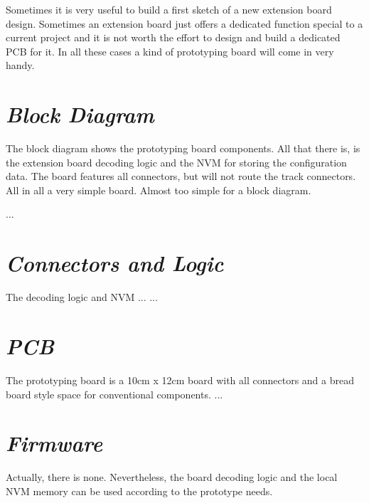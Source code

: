 
Sometimes it is very useful to build a first sketch of a new extension board design. Sometimes an extension board just offers a dedicated function special to a current project and it is not worth the effort to design and build a dedicated PCB for it. In all these cases a kind of prototyping board will come in very handy.

\section{\textit{Block Diagram}}

The block diagram shows the prototyping board components. All that there is, is the extension board decoding logic and the NVM for storing the configuration data. The board features all connectors, but will not route the track connectors. All in all a very simple board. Almost too simple for a block diagram.

...

\section{\textit{Connectors and Logic}}

The decoding logic and NVM ...
...

\section{\textit{PCB}}

The prototyping board is a 10cm x 12cm board with all connectors and a bread board style space for conventional components.
...

\section{\textit{Firmware}}

Actually, there is none. Nevertheless, the board decoding logic and the local NVM memory can be used according to the prototype needs.


